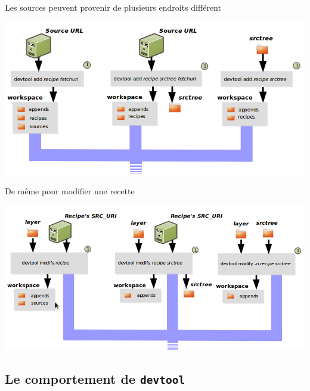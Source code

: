 \documentclass[compress]{smilebeamer}
\begin{document}
\begin{frame}
Les sources peuvent provenir de plusieurs endroits différent
\begin{center}
	\includegraphics[width=1\textwidth]{images/devtool-add-src.png}
\end{center}
\end{frame}

\begin{frame}
De même pour modifier une recette
\begin{center}
	\includegraphics[width=1\textwidth]{images/devtool-modify-src.png}
\end{center}
\end{frame}

\subsection{Le comportement de \texttt{devtool}}
\end{document}
